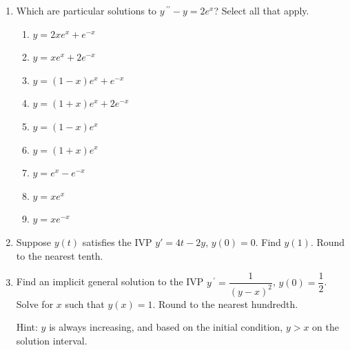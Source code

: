 \documentclass{ximera}
\newenvironment{mcenum}
{ \begin{enumerate}[itemsep=1em, topsep=1em, label=$\bigcirc$ (\alph*), align=left]
     }
{ \end{enumerate}                  }
\begin{document}
\begin{enumerate}[label=(\arabic*)]
\newpage

\item Which are particular solutions to $y\,^{\prime\prime}-y=2e^x$?   Select all that apply.


\begin{mcenum}
\item $y=2xe^x+e^{-x}$
\item $y=xe^x+2e^{-x}$ %
\item $y=(1-x)e^x+e^{-x}$
\item $y=(1+x)e^x+2e^{-x}$  %
\item $y=(1-x)e^x$
\item $y=(1+x)e^x$ %
\item $y=e^x-e^{-x}$
\item $y=xe^{x}$  %
\item $y=xe^{-x}$
\end{mcenum}


\item  Suppose $y(t)$ satisfies the IVP $y'=4t-2y$, $y(0)=0$.  Find $y(1)$.  Round to the nearest tenth.






\item Find an implicit general solution to the IVP $y\,^{\prime}=\dfrac{1}{(y-x)^2}$, $y(0)=\dfrac{1}{2}$.  Solve for $x$ such that $y(x)=1$.   Round to the nearest hundredth.

    Hint: $y$ is always increasing, and based on the initial condition, $y>x$ on the solution interval.









\end{enumerate}
\end{document}
